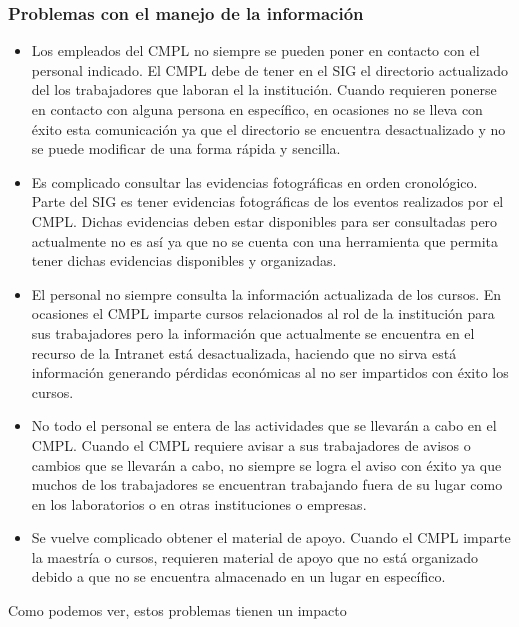 		\subsubsection{Problemas con el manejo de la información}
\begin{itemize}
	
	\item Los empleados del CMPL no siempre se pueden poner en contacto con el personal indicado.	
El CMPL debe de tener en el SIG el directorio actualizado del los trabajadores que laboran el la institución. Cuando requieren ponerse en contacto con alguna persona en específico, en ocasiones no se lleva con éxito esta comunicación ya que el directorio se encuentra desactualizado y no se puede modificar de una forma rápida y sencilla.
	
	\item Es complicado consultar las evidencias fotográficas en orden cronológico.
Parte del SIG es tener evidencias fotográficas de los eventos realizados por el CMPL. Dichas evidencias deben estar disponibles para ser consultadas pero actualmente no es así ya que no se cuenta con una herramienta que permita tener dichas evidencias disponibles y organizadas.
	
	\item El personal no siempre consulta la información actualizada de los cursos.
En ocasiones el CMPL imparte cursos relacionados al rol de la institución para sus trabajadores pero la información que actualmente se encuentra en el recurso de la Intranet está desactualizada, haciendo que no sirva está información generando pérdidas económicas al no ser impartidos con éxito los cursos.

	\item No todo el personal se entera de las actividades que se llevarán a cabo en el CMPL.
Cuando el CMPL requiere avisar a sus trabajadores de avisos o cambios que se llevarán a cabo, no siempre se logra el aviso con éxito ya que muchos de los trabajadores se encuentran trabajando fuera de su lugar como en los laboratorios o en otras instituciones o empresas.	
	
	\item Se vuelve complicado obtener el material de apoyo.	
Cuando el CMPL imparte la maestría o cursos, requieren material de apoyo que no está organizado debido a que no se encuentra almacenado en un lugar en específico.	
	
\end{itemize}

Como podemos ver, estos problemas tienen un impacto
